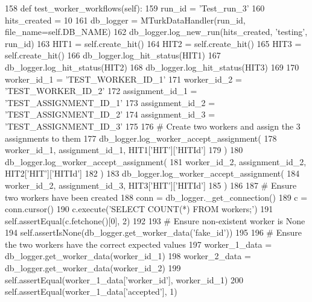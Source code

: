 \begin{DoxyCode}
158     \textcolor{keyword}{def }test\_worker\_workflows(self):
159         run\_id = \textcolor{stringliteral}{'Test\_run\_3'}
160         hits\_created = 10
161         db\_logger = MTurkDataHandler(run\_id, file\_name=self.DB\_NAME)
162         db\_logger.log\_new\_run(hits\_created, \textcolor{stringliteral}{'testing'}, run\_id)
163         HIT1 = self.create\_hit()
164         HIT2 = self.create\_hit()
165         HIT3 = self.create\_hit()
166         db\_logger.log\_hit\_status(HIT1)
167         db\_logger.log\_hit\_status(HIT2)
168         db\_logger.log\_hit\_status(HIT3)
169 
170         worker\_id\_1 = \textcolor{stringliteral}{'TEST\_WORKER\_ID\_1'}
171         worker\_id\_2 = \textcolor{stringliteral}{'TEST\_WORKER\_ID\_2'}
172         assignment\_id\_1 = \textcolor{stringliteral}{'TEST\_ASSIGNMENT\_ID\_1'}
173         assignment\_id\_2 = \textcolor{stringliteral}{'TEST\_ASSIGNMENT\_ID\_2'}
174         assignment\_id\_3 = \textcolor{stringliteral}{'TEST\_ASSIGNMENT\_ID\_3'}
175 
176         \textcolor{comment}{# Create two workers and assign the 3 assignments to them}
177         db\_logger.log\_worker\_accept\_assignment(
178             worker\_id\_1, assignment\_id\_1, HIT1[\textcolor{stringliteral}{'HIT'}][\textcolor{stringliteral}{'HITId'}]
179         )
180         db\_logger.log\_worker\_accept\_assignment(
181             worker\_id\_2, assignment\_id\_2, HIT2[\textcolor{stringliteral}{'HIT'}][\textcolor{stringliteral}{'HITId'}]
182         )
183         db\_logger.log\_worker\_accept\_assignment(
184             worker\_id\_2, assignment\_id\_3, HIT3[\textcolor{stringliteral}{'HIT'}][\textcolor{stringliteral}{'HITId'}]
185         )
186 
187         \textcolor{comment}{# Ensure two workers have been created}
188         conn = db\_logger.\_get\_connection()
189         c = conn.cursor()
190         c.execute(\textcolor{stringliteral}{'SELECT COUNT(*) FROM workers;'})
191         self.assertEqual(c.fetchone()[0], 2)
192 
193         \textcolor{comment}{# Ensure non-existent worker is None}
194         self.assertIsNone(db\_logger.get\_worker\_data(\textcolor{stringliteral}{'fake\_id'}))
195 
196         \textcolor{comment}{# Ensure the two workers have the correct expected values}
197         worker\_1\_data = db\_logger.get\_worker\_data(worker\_id\_1)
198         worker\_2\_data = db\_logger.get\_worker\_data(worker\_id\_2)
199         self.assertEqual(worker\_1\_data[\textcolor{stringliteral}{'worker\_id'}], worker\_id\_1)
200         self.assertEqual(worker\_1\_data[\textcolor{stringliteral}{'accepted'}], 1)

\end{DoxyCode}
